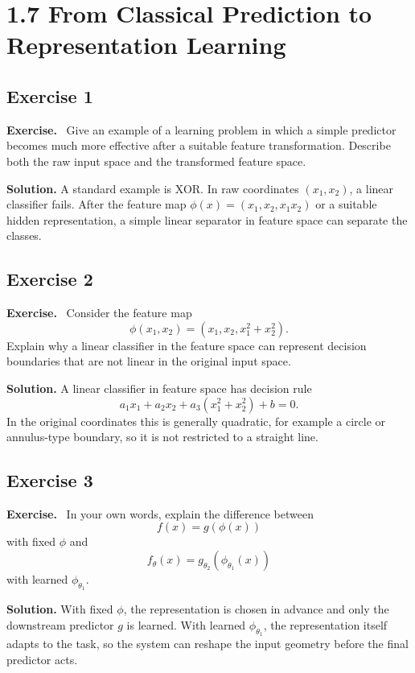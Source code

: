 \documentclass[11pt]{article}
\newenvironment{exercisebox}{\begin{framed}\noindent\textbf{Exercise.}\ }{\end{framed}}
\begin{document}
\section{1.7 From Classical Prediction to Representation Learning}
\subsection*{Exercise 1}
\begin{exercisebox}
Give an example of a learning problem in which a simple predictor becomes much more effective after a suitable feature transformation. Describe both the raw input space and the transformed feature space.
\end{exercisebox}
\textbf{Solution.} A standard example is XOR. In raw coordinates $(x_1,x_2)$, a linear classifier fails. After the feature map $\phi(x)=(x_1,x_2,x_1x_2)$ or a suitable hidden representation, a simple linear separator in feature space can separate the classes.

\subsection*{Exercise 2}
\begin{exercisebox}
Consider the feature map
\[
\phi(x_1,x_2)=(x_1,x_2,x_1^2+x_2^2).
\]
Explain why a linear classifier in the feature space can represent decision boundaries that are not linear in the original input space.
\end{exercisebox}
\textbf{Solution.} A linear classifier in feature space has decision rule
\[
a_1x_1+a_2x_2+a_3(x_1^2+x_2^2)+b=0.
\]
In the original coordinates this is generally quadratic, for example a circle or annulus-type boundary, so it is not restricted to a straight line.

\subsection*{Exercise 3}
\begin{exercisebox}
In your own words, explain the difference between
\[
f(x)=g(\phi(x))
\]
with fixed $\phi$ and
\[
f_\theta(x)=g_{\theta_2}(\phi_{\theta_1}(x))
\]
with learned $\phi_{\theta_1}$.
\end{exercisebox}
\textbf{Solution.} With fixed $\phi$, the representation is chosen in advance and only the downstream predictor $g$ is learned. With learned $\phi_{\theta_1}$, the representation itself adapts to the task, so the system can reshape the input geometry before the final predictor acts.
\end{document}
